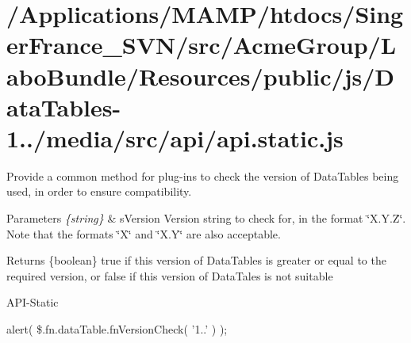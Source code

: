 \hypertarget{_2_applications_2_m_a_m_p_2htdocs_2_singer_france__s_v_n_2src_2_acme_group_2_labo_bundle_2_resou55a55194298d651b69173894306ed858}{\section{/\+Applications/\+M\+A\+M\+P/htdocs/\+Singer\+France\+\_\+\+S\+V\+N/src/\+Acme\+Group/\+Labo\+Bundle/\+Resources/public/js/\+Data\+Tables-\/1../media/src/api/api.\+static.\+js}
}
Provide a common method for plug-\/ins to check the version of Data\+Tables being used, in order to ensure compatibility. 
\begin{DoxyParams}{Parameters}
{\em \{string\}} & s\+Version Version string to check for, in the format \char`\"{}\+X.\+Y.\+Z\char`\"{}. Note that the formats \char`\"{}\+X\char`\"{} and \char`\"{}\+X.\+Y\char`\"{} are also acceptable. \\
\hline
\end{DoxyParams}
\begin{DoxyReturn}{Returns}
\{boolean\} true if this version of Data\+Tables is greater or equal to the required version, or false if this version of Data\+Tales is not suitable
\end{DoxyReturn}
A\+P\+I-\/\+Static

alert( \$.fn.\+data\+Table.\+fn\+Version\+Check( '1..' ) );


\begin{DoxyCodeInclude}
\end{DoxyCodeInclude}
 